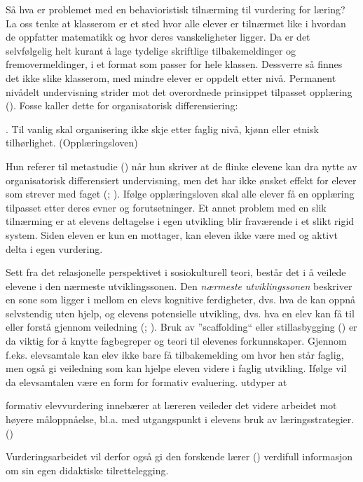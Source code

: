 \documentclass[main.tex]{subfiles}
\begin{document}
Så hva er problemet med en behavioristisk tilnærming til vurdering for læring? La oss tenke at klasserom er 
et sted hvor alle elever er tilnærmet like i hvordan de oppfatter matematikk og hvor deres vanskeligheter ligger. 
Da er det selvfølgelig helt kurant å lage tydelige skriftlige tilbakemeldinger og fremovermeldinger, i et format 
som passer for hele klassen. Dessverre så finnes det ikke slike klasserom, med mindre elever er oppdelt etter nivå. 
Permanent nivådelt undervisning strider mot det overordnede prinsippet tilpasset opplæring (). 
Fosse kaller dette for organisatorisk differensiering:
\begin{displayquote}
\textelp{}. Til vanlig skal organisering ikke skje etter faglig nivå, kjønn eller etnisk tilhørlighet. (Opplæringsloven)
\end{displayquote}
Hun referer til metastudie () når hun skriver at de flinke elevene kan dra nytte av organisatorisk
differensiert undervisning, men det har ikke ønsket effekt for elever som strever med faget (;
). 
Ifølge opplæringsloven skal alle elever få en opplæring tilpasset etter deres evner og forutsetninger. Et annet problem 
med en slik tilnærming er at elevens deltagelse i egen utvikling blir fraværende i et slikt rigid system. Siden eleven er 
kun en mottager, kan eleven ikke være med og aktivt delta i egen vurdering. 
\newline

Sett fra det relasjonelle perspektivet i sosiokulturell teori, består det i å veilede elevene i den 
nærmeste utviklingssonen. Den \emph{nærmeste utviklingssonen} beskriver en sone som ligger i mellom en elevs kognitive 
ferdigheter, dvs. hva de kan oppnå selvstendig uten hjelp, og elevens potensielle utvikling, dvs. 
hva en elev kan få til eller forstå gjennom veiledning (; ). 
Bruk av ''scaffolding`` eller stillasbygging () er da viktig for å knytte fagbegreper og 
teori til elevenes forkunnskaper. Gjennom f.eks. elevsamtale kan elev ikke bare få 
tilbakemelding om hvor hen står faglig, men også gi veiledning som kan hjelpe eleven videre i faglig utvikling.
Ifølge  vil da elevsamtalen være en form for formativ evaluering.  utdyper at
\begin{displayquote}
\textelp{} formativ elevvurdering innebærer at læreren veileder det videre arbeidet mot høyere måloppnåelse,
bl.a. med utgangspunkt i elevens  bruk av læringsstrategier.
() 
\end{displayquote}
Vurderingsarbeidet vil derfor også gi den forskende lærer () 
verdifull informasjon om sin egen didaktiske tilrettelegging.
\newline 
\end{document}
